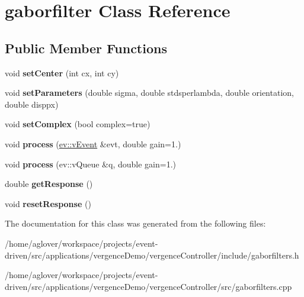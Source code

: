 \hypertarget{classgaborfilter}{}\section{gaborfilter Class Reference}
\label{classgaborfilter}
\subsection*{Public Member Functions}
\begin{DoxyCompactItemize}
\item 
void {\bfseries set\+Center} (int cx, int cy)\hypertarget{classgaborfilter_ab851caaccfdec1ed1d1d49a93b5474a3}{}\label{classgaborfilter_ab851caaccfdec1ed1d1d49a93b5474a3}

\item 
void {\bfseries set\+Parameters} (double sigma, double stdsperlambda, double orientation, double disppx)\hypertarget{classgaborfilter_af246a88ffb2219f4a08bba2449f03d4c}{}\label{classgaborfilter_af246a88ffb2219f4a08bba2449f03d4c}

\item 
void {\bfseries set\+Complex} (bool complex=true)\hypertarget{classgaborfilter_a8b0747961e18733e0f6c266ef76f27f6}{}\label{classgaborfilter_a8b0747961e18733e0f6c266ef76f27f6}

\item 
void {\bfseries process} (\hyperlink{classev_1_1vEvent}{ev\+::v\+Event} \&evt, double gain=1.)\hypertarget{classgaborfilter_aad471cb7dd8948b1cc266d5016be7510}{}\label{classgaborfilter_aad471cb7dd8948b1cc266d5016be7510}

\item 
void {\bfseries process} (ev\+::v\+Queue \&q, double gain=1.)\hypertarget{classgaborfilter_ac92cb33f0d1a179a1b023f4f06d625f1}{}\label{classgaborfilter_ac92cb33f0d1a179a1b023f4f06d625f1}

\item 
double {\bfseries get\+Response} ()\hypertarget{classgaborfilter_a5db2373d31fb563fd560f7e1638f7af2}{}\label{classgaborfilter_a5db2373d31fb563fd560f7e1638f7af2}

\item 
void {\bfseries reset\+Response} ()\hypertarget{classgaborfilter_af3fec16a09439bf76c3df196285a28c0}{}\label{classgaborfilter_af3fec16a09439bf76c3df196285a28c0}

\end{DoxyCompactItemize}


The documentation for this class was generated from the following files\+:\begin{DoxyCompactItemize}
\item 
/home/aglover/workspace/projects/event-\/driven/src/applications/vergence\+Demo/vergence\+Controller/include/gaborfilters.\+h\item 
/home/aglover/workspace/projects/event-\/driven/src/applications/vergence\+Demo/vergence\+Controller/src/gaborfilters.\+cpp\end{DoxyCompactItemize}
